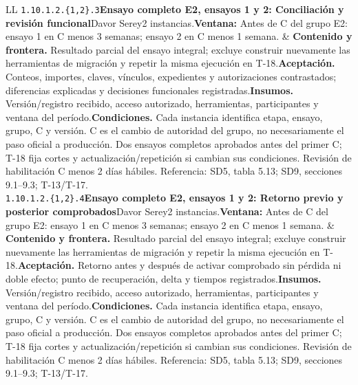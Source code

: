 \begin{longtable}{L{\tabcolsep\relax}L{\tabcolsep\relax}}
\texttt{1.\allowbreak{}10.\allowbreak{}1.\allowbreak{}2.\allowbreak{}\{1,\allowbreak{}2\}.\allowbreak{}3}\newline{}\textbf{Ensayo completo E2, ensayos 1 y 2: Conciliación y revisión funcional}\newline{}Davor Serey\newline{}2 instancias.\newline{}\textbf{Ventana:} Antes de C del grupo E2: ensayo 1 en C menos 3 semanas; ensayo 2 en C menos 1 semana. & \textbf{Contenido y frontera.} Resultado parcial del ensayo integral; excluye construir nuevamente las herramientas de migración y repetir la misma ejecución en T-18.\newline{}\textbf{Aceptación.} Conteos, importes, claves, vínculos, expedientes y autorizaciones contrastados; diferencias explicadas y decisiones funcionales registradas.\newline{}\textbf{Insumos.} Versión/registro recibido, acceso autorizado, herramientas, participantes y ventana del período.\newline{}\textbf{Condiciones.} Cada instancia identifica etapa, ensayo, grupo, C y versión. C es el cambio de autoridad del grupo, no necesariamente el paso oficial a producción. Dos ensayos completos aprobados antes del primer C; T-18 fija cortes y actualización/repetición si cambian sus condiciones. Revisión de habilitación C menos 2 días hábiles. Referencia: SD5, tabla 5.13; SD9, secciones 9.1--9.3; T-13/T-17.\\\hline
\texttt{1.\allowbreak{}10.\allowbreak{}1.\allowbreak{}2.\allowbreak{}\{1,\allowbreak{}2\}.\allowbreak{}4}\newline{}\textbf{Ensayo completo E2, ensayos 1 y 2: Retorno previo y posterior comprobados}\newline{}Davor Serey\newline{}2 instancias.\newline{}\textbf{Ventana:} Antes de C del grupo E2: ensayo 1 en C menos 3 semanas; ensayo 2 en C menos 1 semana. & \textbf{Contenido y frontera.} Resultado parcial del ensayo integral; excluye construir nuevamente las herramientas de migración y repetir la misma ejecución en T-18.\newline{}\textbf{Aceptación.} Retorno antes y después de activar comprobado sin pérdida ni doble efecto; punto de recuperación, delta y tiempos registrados.\newline{}\textbf{Insumos.} Versión/registro recibido, acceso autorizado, herramientas, participantes y ventana del período.\newline{}\textbf{Condiciones.} Cada instancia identifica etapa, ensayo, grupo, C y versión. C es el cambio de autoridad del grupo, no necesariamente el paso oficial a producción. Dos ensayos completos aprobados antes del primer C; T-18 fija cortes y actualización/repetición si cambian sus condiciones. Revisión de habilitación C menos 2 días hábiles. Referencia: SD5, tabla 5.13; SD9, secciones 9.1--9.3; T-13/T-17.\\\hline

\end{longtable}
